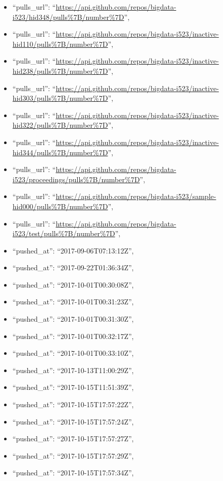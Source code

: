 \begin{itemize}
\item
  ``pulls\_url'':
  ``\url{https://api.github.com/repos/bigdata-i523/hid348/pulls\%7B/number\%7D}'',
\item
  ``pulls\_url'':
  ``\url{https://api.github.com/repos/bigdata-i523/inactive-hid110/pulls\%7B/number\%7D}'',
\item
  ``pulls\_url'':
  ``\url{https://api.github.com/repos/bigdata-i523/inactive-hid238/pulls\%7B/number\%7D}'',
\item
  ``pulls\_url'':
  ``\url{https://api.github.com/repos/bigdata-i523/inactive-hid303/pulls\%7B/number\%7D}'',
\item
  ``pulls\_url'':
  ``\url{https://api.github.com/repos/bigdata-i523/inactive-hid322/pulls\%7B/number\%7D}'',
\item
  ``pulls\_url'':
  ``\url{https://api.github.com/repos/bigdata-i523/inactive-hid344/pulls\%7B/number\%7D}'',
\item
  ``pulls\_url'':
  ``\url{https://api.github.com/repos/bigdata-i523/proceedings/pulls\%7B/number\%7D}'',
\item
  ``pulls\_url'':
  ``\url{https://api.github.com/repos/bigdata-i523/sample-hid000/pulls\%7B/number\%7D}'',
\item
  ``pulls\_url'':
  ``\url{https://api.github.com/repos/bigdata-i523/test/pulls\%7B/number\%7D}'',
\item
  ``pushed\_at'': ``2017-09-06T07:13:12Z'',
\item
  ``pushed\_at'': ``2017-09-22T01:36:34Z'',
\item
  ``pushed\_at'': ``2017-10-01T00:30:08Z'',
\item
  ``pushed\_at'': ``2017-10-01T00:31:23Z'',
\item
  ``pushed\_at'': ``2017-10-01T00:31:30Z'',
\item
  ``pushed\_at'': ``2017-10-01T00:32:17Z'',
\item
  ``pushed\_at'': ``2017-10-01T00:33:10Z'',
\item
  ``pushed\_at'': ``2017-10-13T11:00:29Z'',
\item
  ``pushed\_at'': ``2017-10-15T11:51:39Z'',
\item
  ``pushed\_at'': ``2017-10-15T17:57:22Z'',
\item
  ``pushed\_at'': ``2017-10-15T17:57:24Z'',
\item
  ``pushed\_at'': ``2017-10-15T17:57:27Z'',
\item
  ``pushed\_at'': ``2017-10-15T17:57:29Z'',
\item
  ``pushed\_at'': ``2017-10-15T17:57:34Z'',

\end{itemize}
